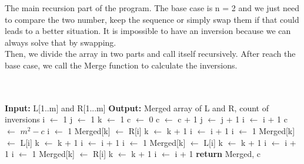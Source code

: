 \documentclass{article}
\begin{document}
    The main recursion part of the program. The base case is n = 2 and we just need to compare the two number, keep the sequence or simply swap them if that could leads to a better situation. It is impossible to have an inversion because we can always solve that by swapping. \\
    Then, we divide the array in two parts and call itself recursively. After reach the base case, we call the Merge function to calculate the inversions. \\
    \\ 
    \\
     \begin{algorithm}
    \begin{algorithmic}[1]
        \State \textbf{Input:} L[1..m] and R[1...m]
        \State \textbf{Output:} Merged array of L and R, count of inversions
        \State i  $\leftarrow$ 1
        \State j  $\leftarrow$ 1
        \State k  $\leftarrow$ 1
        \State c  $\leftarrow$ 0
        \State 
                    \State c $\leftarrow$ c + 1
                \EndIf
            \State j $\leftarrow$ j + 1
            \EndWhile
            \State i $\leftarrow$ i + 1
        \EndWhile
            \State c $\leftarrow$ $m^2 - c$
            \State i  $\leftarrow$ 1
                \State Merged[k] $\leftarrow$ R[i]
                \State k $\leftarrow$ k + 1
                \State i $\leftarrow$ i + 1
            \EndWhile
            \State i  $\leftarrow$ 1
                \State Merged[k] $\leftarrow$ L[i]
                \State k $\leftarrow$ k + 1
                \State i $\leftarrow$ i + 1
            \EndWhile
        \Else 
            \State i  $\leftarrow$ 1
                \State Merged[k] $\leftarrow$ L[i]
                \State k $\leftarrow$ k + 1
                \State i $\leftarrow$ i + 1
            \EndWhile
            \State i  $\leftarrow$ 1
                \State Merged[k] $\leftarrow$ R[i]
                \State k $\leftarrow$ k + 1
                \State i $\leftarrow$ i + 1
            \EndWhile
        \EndIf
        \State \textbf{return} {Merged, c}
    \EndProcedure

    

   
    \end{algorithmic}
\end{algorithm}
\end{document}
